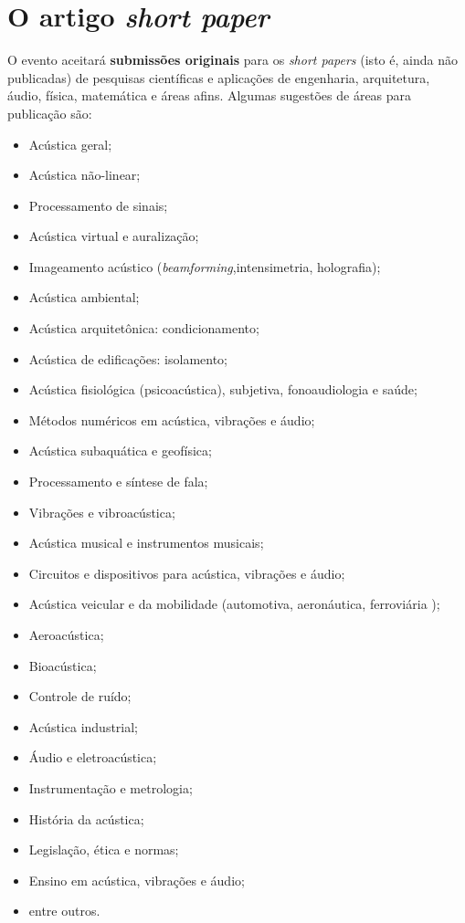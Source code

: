 \documentclass[12pt, a4paper, twoside, twocolumn]{article}
\begin{document}
\section{O artigo \textit{short paper}}

O evento aceitará \textbf{submissões originais} para os \textit{short papers} (isto é, ainda não publicadas) de pesquisas científicas e aplicações de engenharia, arquitetura, áudio, física, matemática e áreas afins. 
%
Algumas sugestões de áreas para publicação são:
%	
\begin{itemize}[noitemsep,topsep=-1ex] \itemsep=1.5pt
\item[\textbullet] Acústica geral; 
\item[\textbullet] Acústica não-linear; 
\item[\textbullet] Processamento de sinais; 
\item[\textbullet] Acústica virtual e auralização; 
\item[\textbullet] Imageamento acústico (\textit{beamforming},\linebreak intensimetria, holografia); 
\item[\textbullet] Acústica ambiental; 
\item[\textbullet] Acústica arquitetônica: condicionamento; 
\item[\textbullet] Acústica de edificações: isolamento; 
\item[\textbullet] Acústica fisiológica (psicoacústica), subjetiva, fonoaudiologia e saúde; 
\item[\textbullet] Métodos numéricos em acústica, vibrações e áudio;  
\item[\textbullet] Acústica subaquática e geofísica; 
\item[\textbullet] Processamento e síntese de fala; 
\item[\textbullet] Vibrações e vibroacústica;
\item[\textbullet] Acústica musical e instrumentos musicais; 
\item[\textbullet] Circuitos e dispositivos para acústica, vibrações e áudio;
\item[\textbullet] Acústica veicular e da mobilidade (automotiva, aeronáutica, ferroviária \etc); 
\item[\textbullet] Aeroacústica; 
\item[\textbullet] Bioacústica; 
\item[\textbullet] Controle de ruído; 
\item[\textbullet] Acústica industrial; 
\item[\textbullet] Áudio e eletroacústica; 
\item[\textbullet] Instrumentação e metrologia; 
\item[\textbullet] História da acústica; 
\item[\textbullet] Legislação, ética e normas;
\item[\textbullet] Ensino em acústica, vibrações e áudio;
\item[\textbullet] entre outros.
\end{itemize}
\vspace{2mm}	
\end{document}
